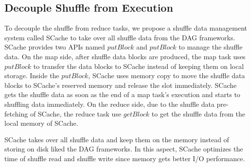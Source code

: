 \subsection{Decouple Shuffle from Execution}
{\color{blue}
To decouple the shuffle from reduce tasks, we propose a shuffle data management system called SCache to take over all shuffle data from the DAG frameworks.
SCache provides two APIs named $putBlock$ and $putBlock$ to manage the shuffle data.
On the map side, after shuffle data blocks are produced, the map task uses $putBlock$ to transfer the data blocks to SCache instead of keeping them on local storage.
Inside the $putBlock$, SCache uses memory copy to move the shuffle data blocks to SCache's reserved memory and release the slot immediately.
SCache gets the shuffle data as soon as the end of a map task's execution and starts to shuffling data immediately.
On the reduce side, due to the shuffle data pre-fetching of SCache, the reduce task use $getBlock$ to get the shuffle data from the local memory of SCache.

SCache takes over all shuffle data and keep them on the memory instead of storing on disk liked the DAG frameworks.
In this aspect, SCache optimizes the time of shuffle read and shuffle write since memory gets better I/O performance.
}


